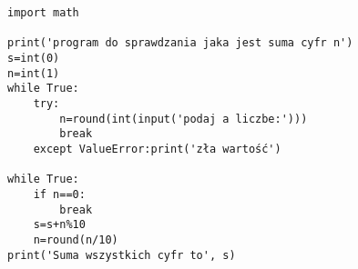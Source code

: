 \begin{verbatim}
import math

print('program do sprawdzania jaka jest suma cyfr n')
s=int(0)
n=int(1)
while True:
    try:
        n=round(int(input('podaj a liczbe:')))
        break   
    except ValueError:print('zła wartość')

while True:
    if n==0:
        break
    s=s+n%10
    n=round(n/10)
print('Suma wszystkich cyfr to', s)
\end{verbatim}